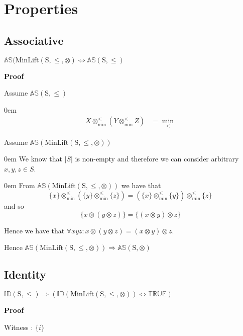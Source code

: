\documentclass[10pt]{article}
\newcommand{\propname}[1]{{\mathbb{#1}}}
\newcommand{\minlift}{\otimes_{\min}^{\leq}}
\newcommand{\proof}{\vspace{1em} \textbf{Proof} \vspace{1em}}
\newenvironment{ind}[0]{\begin{addmargin}[1em]{0em}\vspace{0.5em}}{\end{addmargin}\vspace{0.5em}}
\begin{document}
\section{Properties}

\subsection{Associative}

$\propname{AS}(\mathrm{MinLift(S,\leq,\otimes)} \Leftrightarrow \propname{AS}(\mathrm{S,\leq})$

\proof

Assume $\propname{AS}(\mathrm{S,\leq})$
\begin{ind}
\begin{align*}
X \minlift (Y \minlift Z) 	& = \min_\leq
\end{align*}
\end{ind}

\vspace{0.5em}


Assume $\propname{AS}(\mathrm{MinLift(S,\leq,\otimes)})$

\begin{ind}
We know that $|S|$ is non-empty and therefore we can consider arbitrary $x, y, z \in S$. 
\begin{ind}
From $\propname{AS}(\mathrm{MinLift(S,\leq,\otimes)})$ we have that
\begin{equation*}
\{ x \} \minlift (\{ y \} \minlift \{ z \}) = (\{ x \} \minlift \{ y \}) \minlift \{ z \}
\end{equation*}
and so
\begin{equation*}
\{x \otimes (y \otimes z) \} = \{ (x \otimes y) \otimes z \}
\end{equation*}
\end{ind}
Hence we have that $\forall x y z : x \otimes (y \otimes z) = (x \otimes y) \otimes z$.
\end{ind}
Hence $\propname{AS}(\mathrm{MinLift(S,\leq,\otimes)}) \Rightarrow \propname{AS}(\mathrm{S,\otimes})$


\subsection{Identity}

$\propname{ID}\mathrm{(S,\leq)} \Rightarrow (\propname{ID}(\mathrm{MinLift(S,\leq,\otimes)}) \Leftrightarrow \propname{TRUE})$

\proof

Witness : $\{ i \}$
\end{document}
